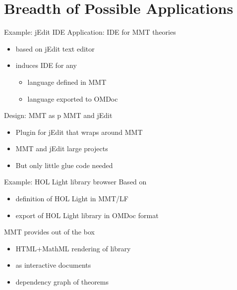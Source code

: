 \documentclass{beamer}
\begin{document}
\section{Breadth of Possible Applications}


\begin{myframe}{Example: jEdit IDE}
Application: IDE for MMT theories 
\begin{itemize}
  \item based on jEdit text editor
  \item induces IDE for any
    \begin{itemize}
    \item language defined in MMT
    \item language exported to OMDoc
    \end{itemize}
\end{itemize}

Design: MMT as p MMT and jEdit
\begin{itemize}
 \item Plugin for jEdit that wraps around MMT
 \item MMT and jEdit large projects
 \item But only little glue code needed
\end{itemize}
\end{myframe}

\begin{myframe}{Example: HOL Light library browser}
Based on
\begin{itemize}
 \item definition of HOL Light in MMT/LF
 \item export of HOL Light library in OMDoc format
\end{itemize}

MMT provides out of the box
  \begin{itemize}
    \item HTML+MathML rendering of library
    \item as interactive documents
    \item dependency graph of theorems
   \end{itemize}
\end{myframe}
\end{document}

